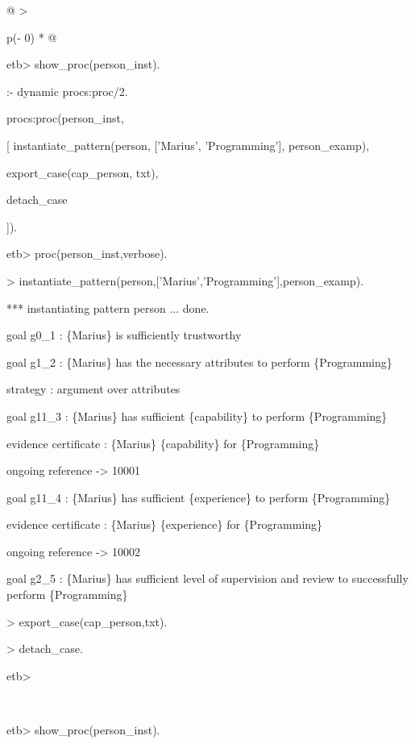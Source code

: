 \documentclass[12pt,twoside,a4paper]{article}
\begin{document}
\begin{longtable}[]{@{}
  >{\raggedright\arraybackslash}p{(\columnwidth - 0\tabcolsep) * }@{}}
\caption{\protect\hypertarget{_Ref175577865}{}{}Table 5 Running the person\_inst procedure}\tabularnewline
\toprule
\begin{minipage}[b]{\linewidth}\raggedright
etb\textgreater{} show\_proc(person\_inst).

:- dynamic procs:proc/2.

procs:proc(person\_inst,

{[} instantiate\_pattern(person, {[}'Marius', 'Programming'{]}, person\_examp),

export\_case(cap\_person, txt),

detach\_case

{]}).

etb\textgreater{} proc(person\_inst,verbose).

\textgreater{} instantiate\_pattern(person,{[}'Marius','Programming'{]},person\_examp).

*** instantiating pattern person ... done.

goal g0\_1 : \{Marius\} is sufficiently trustworthy

goal g1\_2 : \{Marius\} has the necessary attributes to perform \{Programming\}

strategy : argument over attributes

goal g11\_3 : \{Marius\} has sufficient \{capability\} to perform \{Programming\}

evidence certificate : \{Marius\} \{capability\} for \{Programming\}

ongoing reference -\textgreater{} 10001

goal g11\_4 : \{Marius\} has sufficient \{experience\} to perform \{Programming\}

evidence certificate : \{Marius\} \{experience\} for \{Programming\}

ongoing reference -\textgreater{} 10002

goal g2\_5 : \{Marius\} has sufficient level of supervision and review to successfully perform \{Programming\}

\textgreater{} export\_case(cap\_person,txt).

\textgreater{} detach\_case.

etb\textgreater{}
\end{minipage} \\
\midrule
\endfirsthead
\toprule
\begin{minipage}[b]{\linewidth}\raggedright
etb\textgreater{} show\_proc(person\_inst).


\end{minipage}
\end{longtable}
\end{document}
